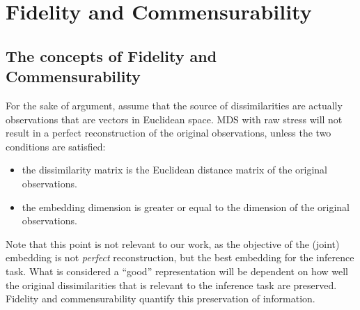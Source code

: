 \documentclass[12pt,oneside,final]{thesis}\usepackage[]{graphicx}\usepackage[]{color}
\begin{document}
\chapter{Fidelity and Commensurability}
\label{chap:FidComm}

\section{The concepts of  Fidelity and Commensurability\label{chap:FidComm}}

For the sake of argument, assume that the source of dissimilarities  are actually observations that are vectors in Euclidean space. MDS with raw stress will not result in a perfect reconstruction  of the original observations, unless the two conditions are satisfied:
\begin{itemize}
\item the dissimilarity matrix is the Euclidean distance matrix of the original observations. 
\item the embedding dimension is greater or equal to the dimension of the original observations.
\end{itemize}
 Note that this point is not relevant to our work, as   the objective of the (joint) embedding is not \emph{perfect} reconstruction, but the best embedding for the inference task. What is considered a ``good''  representation will be dependent on how well the original dissimilarities that is relevant to the inference task are preserved. Fidelity and commensurability quantify this preservation of information.
\end{document}
